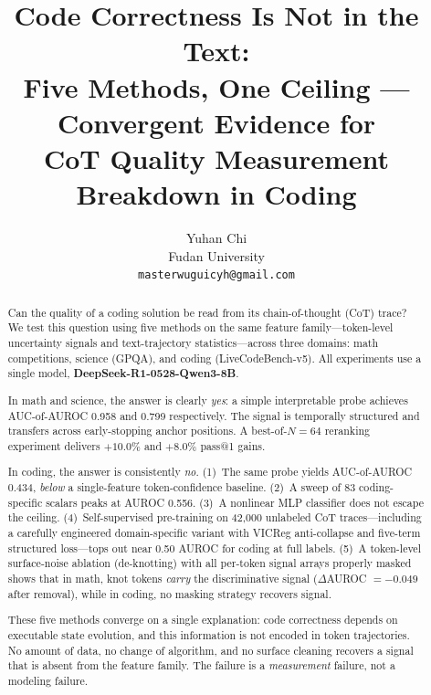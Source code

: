 \documentclass[10pt,twocolumn]{article}
\title{\textbf{Code Correctness Is Not in the Text:\\[4pt]
\large Five Methods, One Ceiling — Convergent Evidence for\\[2pt]
CoT Quality Measurement Breakdown in Coding}}
\author{Yuhan Chi\\Fudan University\\\texttt{masterwuguicyh@gmail.com}}
\date{}
\begin{document}
\maketitle

\begin{abstract}

Can the quality of a coding solution be read from its chain-of-thought (CoT) trace? We test this question using five methods on the same feature family—token-level uncertainty signals and text-trajectory statistics—across three domains: math competitions, science (GPQA), and coding (LiveCodeBench-v5). All experiments use a single model, \textbf{DeepSeek-R1-0528-Qwen3-8B}.

In math and science, the answer is clearly \emph{yes}: a simple interpretable probe achieves AUC-of-AUROC 0.958 and 0.799 respectively. The signal is temporally structured and transfers across early-stopping anchor positions. A best-of-$N=64$ reranking experiment delivers $+10.0\%$ and $+8.0\%$ pass@1 gains.

In coding, the answer is consistently \emph{no}. (1)~The same probe yields AUC-of-AUROC 0.434, \emph{below} a single-feature token-confidence baseline. (2)~A sweep of 83 coding-specific scalars peaks at AUROC 0.556. (3)~A nonlinear MLP classifier does not escape the ceiling. (4)~Self-supervised pre-training on 42{,}000 unlabeled CoT traces—including a carefully engineered domain-specific variant with VICReg anti-collapse and five-term structured loss—tops out near 0.50 AUROC for coding at full labels. (5)~A token-level surface-noise ablation (de-knotting) with all per-token signal arrays properly masked shows that in math, knot tokens \emph{carry} the discriminative signal ($\Delta$AUROC $= -0.049$ after removal), while in coding, no masking strategy recovers signal.

These five methods converge on a single explanation: code correctness depends on executable state evolution, and this information is not encoded in token trajectories. No amount of data, no change of algorithm, and no surface cleaning recovers a signal that is absent from the feature family. The failure is a \emph{measurement} failure, not a modeling failure.

\end{abstract}

\end{document}
